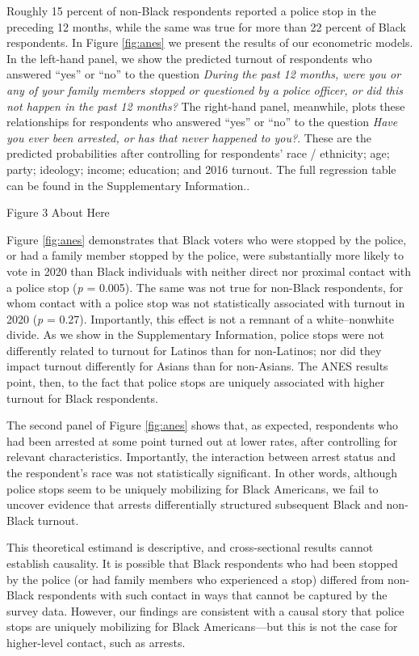 \documentclass[
  12pt,
]{article}
\begin{document}
Roughly 15 percent of non-Black respondents reported a police stop in the preceding 12 months, while the same was true for more than 22 percent of Black respondents. In Figure \ref{fig:anes} we present the results of our econometric models. In the left-hand panel, we show the predicted turnout of respondents who answered ``yes'' or ``no'' to the question \emph{During the past 12 months, were you or any of your family members stopped or questioned by a police officer, or did this not happen in the past 12 months?} The right-hand panel, meanwhile, plots these relationships for respondents who answered ``yes'' or ``no'' to the question \emph{Have you ever been arrested, or has that never happened to you?}. These are the predicted probabilities after controlling for respondents' race / ethnicity; age; party; ideology; income; education; and 2016 turnout. The full regression table can be found in the Supplementary Information..

Figure 3 About Here

Figure \ref{fig:anes} demonstrates that Black voters who were stopped by the police, or had a family member stopped by the police, were substantially more likely to vote in 2020 than Black individuals with neither direct nor proximal contact with a police stop (\emph{p} = 0.005). The same was not true for non-Black respondents, for whom contact with a police stop was not statistically associated with turnout in 2020 (\emph{p} = 0.27). Importantly, this effect is not a remnant of a white--nonwhite divide. As we show in the Supplementary Information, police stops were not differently related to turnout for Latinos than for non-Latinos; nor did they impact turnout differently for Asians than for non-Asians. The ANES results point, then, to the fact that police stops are uniquely associated with higher turnout for Black respondents.

The second panel of Figure \ref{fig:anes} shows that, as expected, respondents who had been arrested at some point turned out at lower rates, after controlling for relevant characteristics. Importantly, the interaction between arrest status and the respondent's race was not statistically significant. In other words, although police stops seem to be uniquely mobilizing for Black Americans, we fail to uncover evidence that arrests differentially structured subsequent Black and non-Black turnout.

This theoretical estimand is descriptive, and cross-sectional results cannot establish causality. It is possible that Black respondents who had been stopped by the police (or had family members who experienced a stop) differed from non-Black respondents with such contact in ways that cannot be captured by the survey data. However, our findings are consistent with a causal story that police stops are uniquely mobilizing for Black Americans---but this is not the case for higher-level contact, such as arrests.
\end{document}
